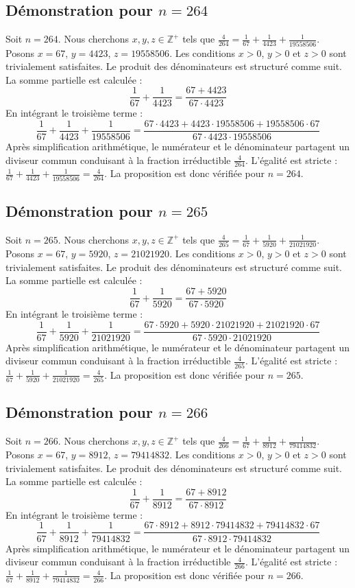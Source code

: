 \documentclass[11pt,a4paper]{article}
\begin{document}
\subsection{Démonstration pour $n = 264$}
Soit $n = 264$. Nous cherchons $x, y, z \in \mathbb{Z}^{+}$ tels que $\frac{4}{264} = \frac{1}{67} + \frac{1}{4423} + \frac{1}{19558506}$.
Posons $x = 67$, $y = 4423$, $z = 19558506$.
Les conditions $x > 0$, $y > 0$ et $z > 0$ sont trivialement satisfaites.
Le produit des dénominateurs est structuré comme suit. La somme partielle est calculée :
$$ \frac{1}{67} + \frac{1}{4423} = \frac{67+4423}{67 \cdot 4423} $$
En intégrant le troisième terme :
$$ \frac{1}{67} + \frac{1}{4423} + \frac{1}{19558506} = \frac{67 \cdot 4423 + 4423 \cdot 19558506 + 19558506 \cdot 67}{67 \cdot 4423 \cdot 19558506} $$
Après simplification arithmétique, le numérateur et le dénominateur partagent un diviseur commun conduisant à la fraction irréductible $\frac{4}{264}$.
L'égalité est stricte : $\frac{1}{67} + \frac{1}{4423} + \frac{1}{19558506} = \frac{4}{264}$.
La proposition est donc vérifiée pour $n = 264$.
\subsection{Démonstration pour $n = 265$}
Soit $n = 265$. Nous cherchons $x, y, z \in \mathbb{Z}^{+}$ tels que $\frac{4}{265} = \frac{1}{67} + \frac{1}{5920} + \frac{1}{21021920}$.
Posons $x = 67$, $y = 5920$, $z = 21021920$.
Les conditions $x > 0$, $y > 0$ et $z > 0$ sont trivialement satisfaites.
Le produit des dénominateurs est structuré comme suit. La somme partielle est calculée :
$$ \frac{1}{67} + \frac{1}{5920} = \frac{67+5920}{67 \cdot 5920} $$
En intégrant le troisième terme :
$$ \frac{1}{67} + \frac{1}{5920} + \frac{1}{21021920} = \frac{67 \cdot 5920 + 5920 \cdot 21021920 + 21021920 \cdot 67}{67 \cdot 5920 \cdot 21021920} $$
Après simplification arithmétique, le numérateur et le dénominateur partagent un diviseur commun conduisant à la fraction irréductible $\frac{4}{265}$.
L'égalité est stricte : $\frac{1}{67} + \frac{1}{5920} + \frac{1}{21021920} = \frac{4}{265}$.
La proposition est donc vérifiée pour $n = 265$.
\subsection{Démonstration pour $n = 266$}
Soit $n = 266$. Nous cherchons $x, y, z \in \mathbb{Z}^{+}$ tels que $\frac{4}{266} = \frac{1}{67} + \frac{1}{8912} + \frac{1}{79414832}$.
Posons $x = 67$, $y = 8912$, $z = 79414832$.
Les conditions $x > 0$, $y > 0$ et $z > 0$ sont trivialement satisfaites.
Le produit des dénominateurs est structuré comme suit. La somme partielle est calculée :
$$ \frac{1}{67} + \frac{1}{8912} = \frac{67+8912}{67 \cdot 8912} $$
En intégrant le troisième terme :
$$ \frac{1}{67} + \frac{1}{8912} + \frac{1}{79414832} = \frac{67 \cdot 8912 + 8912 \cdot 79414832 + 79414832 \cdot 67}{67 \cdot 8912 \cdot 79414832} $$
Après simplification arithmétique, le numérateur et le dénominateur partagent un diviseur commun conduisant à la fraction irréductible $\frac{4}{266}$.
L'égalité est stricte : $\frac{1}{67} + \frac{1}{8912} + \frac{1}{79414832} = \frac{4}{266}$.
La proposition est donc vérifiée pour $n = 266$.
\end{document}
